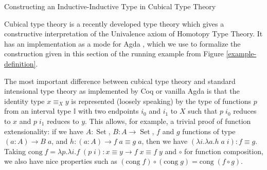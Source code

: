 \documentclass[runningheads]{llncs}
\DeclareMathOperator{\USet}{Set}
\newcommand{\Id}[2]{{#1}\equiv{#2}}
\newcommand{\IdA}[3]{{#1}\equiv_{#3}{#2}}
\newcommand{\II}{\mathbb{I}}
\begin{document}
\begin{section}{Constructing an Inductive-Inductive Type in Cubical Type Theory}\label{example-construct-cubical}

Cubical type theory \citep{cubicaltt_ifcolog} is a recently developed type theory which gives a constructive interpretation of the Univalence axiom of Homotopy Type Theory. It has an implementation as a mode for Agda \citep{AddingCubesToAgda}, which we use to formalize the construction given in this section of the running example from Figure \ref{example-definition}.

The most important difference between cubical type theory and standard intensional type theory as implemented by Coq or vanilla Agda is that the identity type $\IdA{x}{y}{X}$ is represented (loosely speaking) by the type of functions $p$ from an interval type $\II$ with two endpoints $i_0$ and $i_1$ to $X$ such that $p\;i_0$ reduces to $x$ and $p\;i_1$ reduces to $y$. This allows, for example, a trivial proof of function extensionality: if we have $A : \USet$, $B : A\to \USet$, $f$ and $g$ functions of type $(a : A) \to B\;a$, and $h : (a : A) \to \Id{f\;a}{g\;a}$, then we have $(\lambda i.\lambda a.h\;a\;i) : \Id{f}{g}$. Taking $\text{cong}\; f = \lambda p. \lambda i. f\; (p\;i) : \Id{x}{y} \to \Id{f\;x}{f\;y}$ and $\circ$ for function composition, we also have nice properties such as $(\text{cong}\; f) \circ (\text{cong}\; g) = \text{cong}\; (f \circ g)$.


\end{section}
\end{document}
